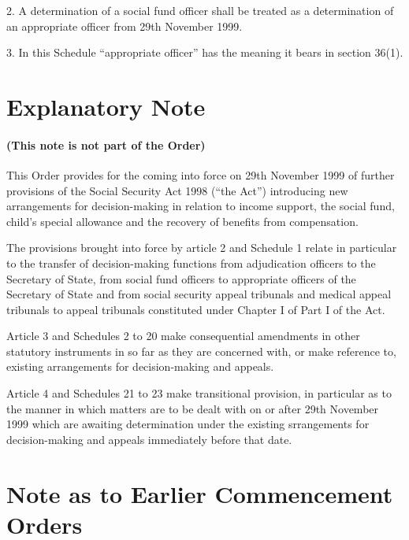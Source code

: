 \documentclass[12pt,a4paper]{article}
\begin{document}
\medskip

2.  A determination of a social fund officer shall be treated as a determination of an appropriate officer from 29th November 1999.

\medskip

3.  In this Schedule “appropriate officer” has the meaning it bears in section 36(1). 

\part{Explanatory Note}

\renewcommand\parthead{--- Explanatory Note}

\subsection*{(This note is not part of the Order)}

This Order provides for the coming into force on 29th November 1999 of further provisions of the Social Security Act 1998 (“the Act”) introducing new arrangements for decision-making in relation to income support, the social fund, child’s special allowance and the recovery of benefits from compensation.

The provisions brought into force by article 2 and Schedule 1 relate in particular to the transfer of decision-making functions from adjudication officers to the Secretary of State, from social fund officers to appropriate officers of the Secretary of State and from social security appeal tribunals and medical appeal tribunals to appeal tribunals constituted under Chapter I of Part I of the Act.

Article 3 and Schedules 2 to 20 make consequential amendments in other statutory instruments in so far as they are concerned with, or make reference to, existing arrangements for decision-making and appeals.

Article 4 and Schedules 21 to 23 make transitional provision, in particular as to the manner in which matters are to be dealt with on or after 29th November 1999 which are awaiting determination under the existing srrangements for decision-making and appeals immediately before that date. 

\part{Note as to Earlier Commencement Orders}

\renewcommand\parthead{--- Note as to Earlier Commencement Orders}
\end{document}
